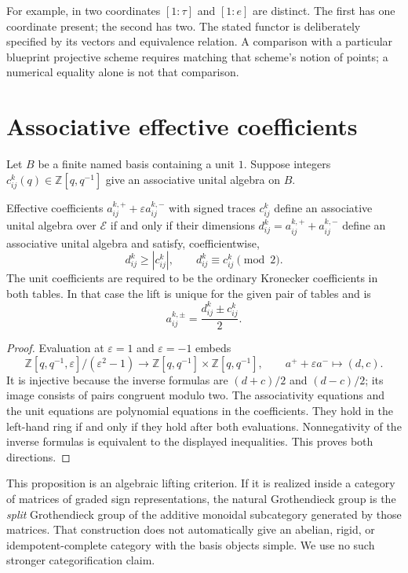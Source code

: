 \documentclass[11pt]{article}
\newcommand{\Z}{\mathbb Z}\newcommand{\N}{\mathbb N}\newcommand{\Q}{\mathbb Q}
\newcommand{\eps}{\varepsilon}\newcommand{\supp}{\operatorname{supp}}
\theoremstyle{definition}\newtheorem{definition}[theorem]{Definition}
\begin{document}
For example, in two coordinates $[1:\tau]$ and $[1:e]$ are distinct. The first has one coordinate present; the second has two. The stated functor is deliberately specified by its vectors and equivalence relation. A comparison with a particular blueprint projective scheme requires matching that scheme's notion of points; a numerical equality alone is not that comparison.





\section{Associative effective coefficients}\label{sec:criterion}
Let $B$ be a finite named basis containing a unit $1$. Suppose integers $c_{ij}^k(q)\in\Z[q,q^{-1}]$ give an associative unital algebra on $B$.

\begin{proposition}\label{prop:criterion}
Effective coefficients $a_{ij}^{k,+}+\eps a_{ij}^{k,-}$ with signed traces $c_{ij}^k$ define an associative unital algebra over $\mathcal E$ if and only if their dimensions $d_{ij}^k=a_{ij}^{k,+}+a_{ij}^{k,-}$ define an associative unital algebra and satisfy, coefficientwise,
\[
 d_{ij}^k\ge |c_{ij}^k|,\qquad d_{ij}^k\equiv c_{ij}^k\pmod2.
\]
The unit coefficients are required to be the ordinary Kronecker coefficients in both tables. In that case the lift is unique for the given pair of tables and is
\[
 a_{ij}^{k,\pm}=\frac{d_{ij}^k\pm c_{ij}^k}{2}.
\]
\end{proposition}
\begin{proof}
Evaluation at $\eps=1$ and $\eps=-1$ embeds
\[
 \Z[q,q^{-1},\eps]/(\eps^2-1)
 \longrightarrow\Z[q,q^{-1}]\times\Z[q,q^{-1}],
 \qquad a^++\eps a^-\longmapsto(d,c).
\]
It is injective because the inverse formulas are $(d+c)/2$ and $(d-c)/2$; its image consists of pairs congruent modulo two. The associativity equations and the unit equations are polynomial equations in the coefficients. They hold in the left-hand ring if and only if they hold after both evaluations. Nonnegativity of the inverse formulas is equivalent to the displayed inequalities. This proves both directions.
\end{proof}

This proposition is an algebraic lifting criterion. If it is realized inside a category of matrices of graded sign representations, the natural Grothendieck group is the \emph{split} Grothendieck group of the additive monoidal subcategory generated by those matrices. That construction does not automatically give an abelian, rigid, or idempotent-complete category with the basis objects simple. We use no such stronger categorification claim.
\end{document}
